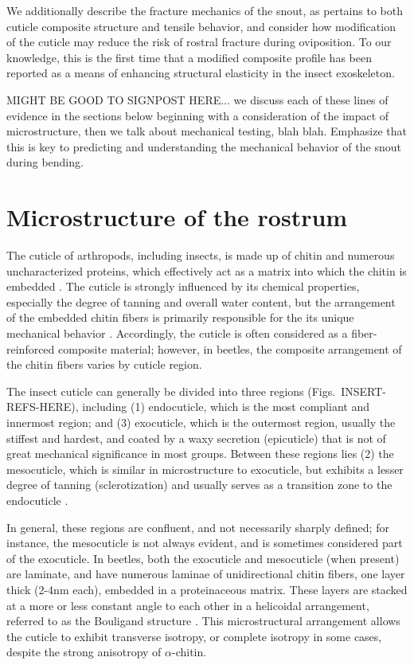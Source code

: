 \documentclass[twocolumn, linenumbers, superscriptaddress]{revtex4-1}
\begin{document}
	We additionally describe the fracture mechanics of the snout, as pertains to both cuticle composite structure and tensile behavior, and consider how modification of the cuticle may reduce the risk of rostral fracture during oviposition.
	To our knowledge, this is the first time that a modified composite profile has been reported as a means of enhancing structural elasticity in the insect exoskeleton.


	MIGHT BE GOOD TO SIGNPOST HERE... we discuss each of these lines of evidence in the sections below beginning with a consideration of the impact of microstructure, then we talk about mechanical testing, blah blah. Emphasize that this is key to predicting and understanding the mechanical behavior of the snout during bending.
	\section{Microstructure of the rostrum}\label{sec:microstructure} %
		The cuticle of arthropods, including insects, is made up of chitin and numerous uncharacterized proteins, which effectively act as a matrix into which the chitin is embedded \cite{Nikolov2011,Nikolov2010,Vincent2004}.
		The cuticle is strongly influenced by its chemical properties, especially the degree of tanning and overall water content, but the arrangement of the embedded chitin fibers is primarily responsible for the its unique mechanical behavior \cite{Klocke2011,Vincent2004}.	
		Accordingly, the cuticle is often considered as a fiber-reinforced composite material; however, in beetles, the composite arrangement of the chitin fibers varies by cuticle region.	
	
		The insect cuticle can generally be divided into three regions (Figs.~INSERT-REFS-HERE), including (1) endocuticle, which is the most compliant and innermost region; and (3) exocuticle, which is the outermost region, usually the stiffest and hardest, and coated by a waxy secretion (epicuticle) that is not of great mechanical significance in most groups.
		Between these regions lies (2) the mesocuticle, which is similar in microstructure to exocuticle, but exhibits a lesser degree of tanning (sclerotization) and usually serves as a transition zone to the endocuticle \cite{Klocke2011,Vincent1982,Vincent2004}.
		
		In general, these regions are confluent, and not necessarily sharply defined; for instance, the mesocuticle is not always evident, and is sometimes considered part of the exocuticle.
		In beetles, both the exocuticle and mesocuticle (when present) are laminate, and have numerous laminae of unidirectional chitin fibers, one layer thick (2-4nm each), embedded in a proteinaceous matrix.
		These layers are stacked at a more or less constant angle to each other in a helicoidal arrangement, referred to as the Bouligand structure \cite{Blackwell1980,Bouligand1972,Neville1976}. 
		This microstructural arrangement allows the cuticle to exhibit transverse isotropy, or complete isotropy in some cases, despite the strong anisotropy of $\alpha$-chitin.
		
\end{document}
